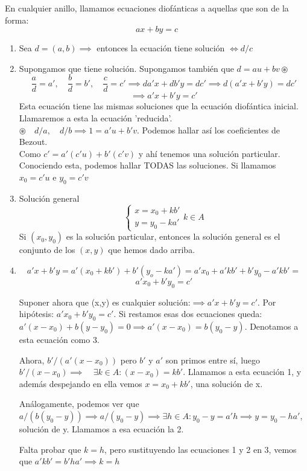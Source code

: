 \documentclass[11pt, a4paper, titlepage]{article}
\makeatletter
\renewenvironment{proof}[1][\proofname] {\vspace{-15pt}\par\pushQED{\qed}\normalfont\topsep6\p@\@plus6\p@\relax\trivlist\item[\hskip\labelsep\it#1\@addpunct{.}]\ignorespaces}{\popQED\endtrivlist\@endpefalse}
\theoremstyle{theorem-style}
\theoremstyle{definition-style}
\theoremstyle{remark-style}
\theoremstyle{example-style}
\newenvironment{nlist}
{\begin{enumerate}
\renewcommand\labelenumi{(\emph{\roman{enumi})}}}
{\end{enumerate}}
\makeatother
\begin{document}
En cualquier anillo, llamamos ecuaciones diofánticas a aquellas que son de la forma:
\[
ax +by  = c
\]
\begin{nlist}
	\item Sea $d=(a,b)\implies$ entonces la ecuación tiene solución $\iff d/c$
	\item Supongamos que tiene solución. Supongamos también que $d= au+bv \circledast$
\[
\frac{a}{d}= a',\quad \frac{b}{d}=b',\quad \frac{c}{d}=c'\implies da'x + db'y = dc' \implies d(a'x+b'y)=dc'\]
\[ \implies a'x+b'y = c'
\]
Esta ecuación tiene las mismas soluciones que la ecuación diofántica inicial. Llamaremos a esta la ecuación 'reducida'.\\
$\circledast\quad d/a ,\quad d/b \implies 1=a'u +b 'v $. Podemos hallar así los coeficientes de Bezout.\\

Como $c'= a'(c'u)+b'(c'v)$ y ahí tenemos una solución particular. Conociendo esta, podemos hallar TODAS las soluciones. Si llamamos $x_0 =c'u$ e $y_0 = c'v$

\item Solución general \[\begin{cases}
	x = x_0 +kb'\\
	y= y_0 -ka'
\end{cases} k\in A\]
Si $(x_0,y_0)$ es la solución particular, entonces la solución general es el conjunto de los $(x,y)$ que hemos dado arriba.
\\
\begin{proof}[Demostración de iii)]

\[
a'x + b'y = a'(x_0 +kb') + b'(y_o - ka') = a'x_0 + a'kb' + b'y_0 - a'kb' = 
\]
\[
a'x_0 +b'y_0 = c'
\]

Suponer ahora que (x,y) es cualquier solución:$\implies a'x +b'y = c'$. Por hipótesis: $a'x_0 +b'y_0 = c'$. Si restamos esas dos ecuaciones queda: $a'(x-x_0) +b(y-y_0) = 0 \implies a'(x-x_0) = b(y_0-y)$. Denotamos a esta ecuación como 3.

Ahora, $b'/(a'(x-x_0))$ pero $b'$ y $a'$ son primos entre sí, luego $b'/(x-x_0)\implies \quad \exists k \in A : (x-x_0) = kb'$. Llamamos a esta ecuación 1, y además despejando en ella vemos $x = x_0 + kb'$, una solución de x.

Análogamente, podemos ver que $a/(b(y_0-y)) \implies a/(y_0-y) \implies \exists h \in A: y_0 -y = a'h \implies y = y_0 - ha'$, solución de y. Llamamos a esa ecuación la 2.

Falta probar que $k = h$, pero sustituyendo las ecuaciones 1 y 2 en 3, vemos que $a'kb'  = b'ha' \implies k = h$
	
\end{proof}

\end{nlist}
\end{document}
